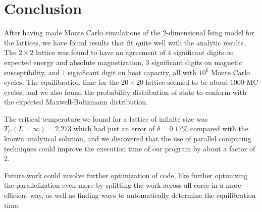 \documentclass[../main.tex]{subfiles}
\begin{document}
\section{Conclusion}\label{sec:conclusion}

After having made Monte Carlo simulations of the 2-dimensional Ising model for the lattices, we have found results that fit quite well with the analytic results. The $2 \times 2$ lattice was found to have an agreement of $4$ significant digits on expected energy and absolute magnetization, $3$ significant digits on magnetic susceptibility, and $1$ significant digit on heat capacity, all with $10^6$ Monte Carlo cycles. The equilibration time for the $20 \times 20$ lattice seemed to be about $1000$ MC cycles, and we also found the probability distribution of state to conform with the expected Maxwell-Boltzmann distribution. 

The critical temperature we found for a lattice of infinite size was $T_C(L = \infty) = 2.273$ which had just an error of $\delta = 0.17\%$ compared with the known analytical solution, and we discovered that the use of parallel computing techniques could improve the execution time of our program by about a factor of $2$.

Future work could involve further optimization of code, like further optimizing the parallelization even more by splitting the work across all cores in a more efficient way, as well as finding ways to automatically determine the equilibration time.
\end{document}
